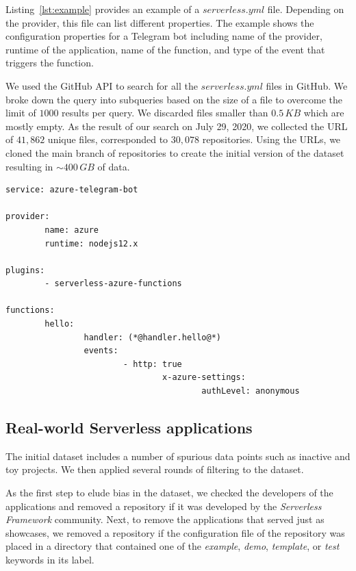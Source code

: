 Listing~\ref{lst:example} provides an example of a $serverless.yml$ file. 
Depending on the provider, this file can list different properties.
The example shows the configuration properties for a Telegram bot including 
name of the provider, runtime of the application, name of the function, 
and type of the event that triggers the function. 

We used the GitHub API to search for all the $serverless.yml$ files in GitHub. 
We broke down the query into subqueries based on the size of a file to 
overcome the limit of $1000$ results per query.
We discarded files smaller than $0.5\,KB$ which are mostly empty.
As the result of our search on July 29, 2020, 
we collected the URL of $41,862$ unique files, corresponded to 
$30,078$ repositories. Using the URLs, we cloned the main branch 
of repositories to create the initial version of the dataset resulting 
in $\sim400 \, GB$ of data.

\vspace{2mm}

\begin{lstlisting}[frame=single, caption=An example of a serverless.yml configuration file., label={lst:example}, captionpos=b]
service: azure-telegram-bot 

provider:  
		name: azure
		runtime: nodejs12.x  

plugins:  
		- serverless-azure-functions 

functions:
		hello:    
				handler: (*@handler.hello@*)
				events:   
						- http: true        
								x-azure-settings:          
										authLevel: anonymous
\end{lstlisting}

\subsection{Real-world Serverless applications} \label{phaseB}
The initial dataset includes a number of spurious data points 
such as inactive and toy projects. We then applied several rounds 
of filtering to the dataset.

As the first step to elude bias in the dataset, we checked the developers 
of the applications and removed a repository if it was developed 
by the \emph{Serverless Framework} community. Next, to remove the applications 
that served just as showcases, we removed a repository if the configuration file 
of the repository was placed in a directory that contained one of the 
\emph{example}, \emph{demo}, \emph{template}, or \emph{test} 
keywords in its label.

